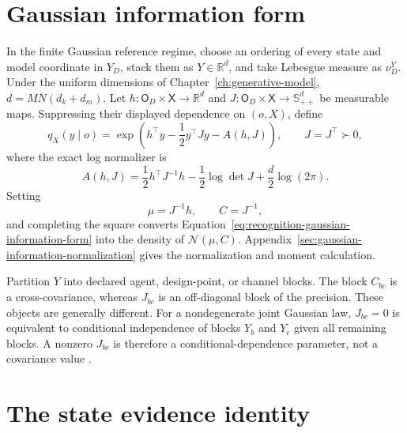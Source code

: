 \section{Gaussian information form}

In the finite Gaussian reference regime, choose an ordering of every state and model coordinate in \(Y_D\), stack them as \(Y\in\mathbb R^d\), and take Lebesgue measure as \(\nu_D^Y\). Under the uniform dimensions of Chapter~\ref{ch:generative-model}, \(d=MN(d_k+d_m)\). Let \(h:\mathsf O_D\times\mathsf X\to\mathbb R^d\) and \(J:\mathsf O_D\times\mathsf X\to\mathbb S_{++}^d\) be measurable maps. Suppressing their displayed dependence on \((o,X)\), define
\begin{equation}
q_X(y\mid o)
=\exp\left(
h^\top y-\frac12y^\top Jy-A(h,J)
\right),
\qquad
J=J^\top\succ0,
\label{eq:recognition-gaussian-information-form}
\end{equation}
where the exact log normalizer is
\begin{equation}
A(h,J)
=\frac12h^\top J^{-1}h
-\frac12\log\det J
+\frac d2\log(2\pi).
\label{eq:recognition-gaussian-log-normalizer}
\end{equation}
Setting
\begin{equation}
\mu=J^{-1}h,
\qquad
C=J^{-1},
\label{eq:recognition-gaussian-moments}
\end{equation}
and completing the square converts Equation~\eqref{eq:recognition-gaussian-information-form} into the density of \(\mathcal N(\mu,C)\). Appendix~\ref{sec:gaussian-information-normalization} gives the normalization and moment calculation.

Partition \(Y\) into declared agent, design-point, or channel blocks. The block \(C_{bc}\) is a cross-covariance, whereas \(J_{bc}\) is an off-diagonal block of the precision. These objects are generally different. For a nondegenerate joint Gaussian law, \(J_{bc}=0\) is equivalent to conditional independence of blocks \(Y_b\) and \(Y_c\) given all remaining blocks. A nonzero \(J_{bc}\) is therefore a conditional-dependence parameter, not a covariance value \citep{Lauritzen1996,Wainwright2008}.

\section{The state evidence identity}

